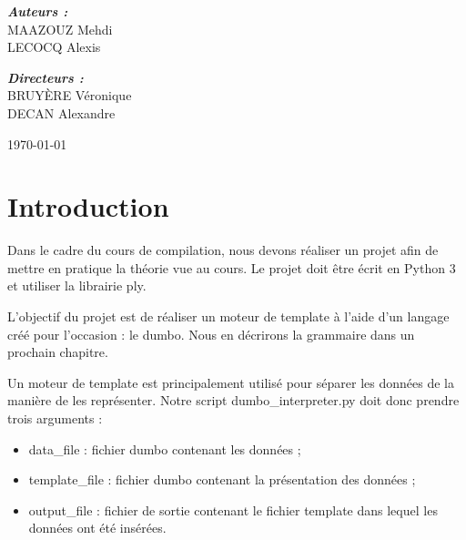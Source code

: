 \documentclass[10pt,a4paper]{article}
\begin{document}
\begin{titlepage}
\begin{sffamily}
\begin{center}
				\begin{minipage}{0.4\textwidth}
					\begin{flushleft} \large
						\emph{\textbf{Auteurs :}}\\
						MAAZOUZ Mehdi\\
						LECOCQ Alexis
					\end{flushleft}
				\end{minipage}
				\begin{minipage}{0.4\textwidth}
					\begin{flushright} \large
						\emph{\textbf{Directeurs :}}\\
						BRUYÈRE Véronique\\
						DECAN Alexandre\\
					\end{flushright}
				\end{minipage}
				
				\vfill
				
				{\large \today}
				
			\end{center}
		\end{sffamily}
	\end{titlepage}
	
	\newpage
	\tableofcontents
	\newpage
	\section{Introduction}
	Dans le cadre du cours de compilation, nous devons réaliser un projet afin de mettre en pratique la théorie vue au cours.
	Le projet doit être écrit en Python 3 et utiliser la librairie ply.
	
	L'objectif du projet est de réaliser un moteur de template à l'aide d'un langage créé pour l'occasion : le dumbo. Nous en décrirons la grammaire dans un prochain chapitre.
	
	Un moteur de template est principalement utilisé pour séparer les données de la manière de les représenter. Notre script dumbo\_interpreter.py doit donc prendre trois arguments :
	\begin{itemize}
		\item data\_file : fichier dumbo contenant les données ;
		\item template\_file : fichier dumbo contenant la présentation des données ;
		\item output\_file : fichier de sortie contenant le fichier template dans lequel les données ont été insérées.
	\end{itemize}
	
\end{document}
